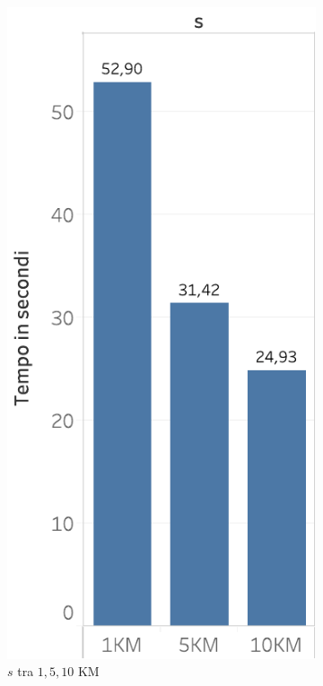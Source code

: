 \begin{figure}
  \centering
  \begin{subfigure}{.5\textwidth}
  \centering
   \includegraphics[scale=0.5]{res/fig/sec-4/performance/TimeS.pdf}
   \caption{\(s\) tra \(1,5,10\) KM}
  \label{fig:chap-4:TimeS}
\end{subfigure}%
\begin{subfigure}{.5\textwidth}
  \centering

\end{subfigure}
\end{figure}
